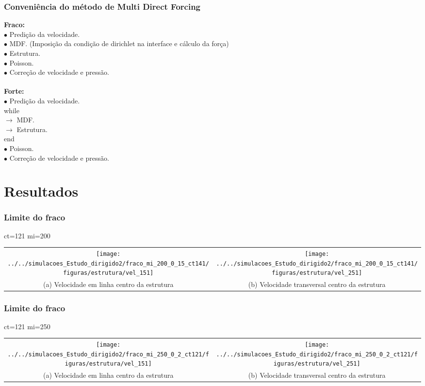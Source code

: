 \documentclass[xcolor=dvipsnames,10pt,aspectratio=169]{beamer}
\begin{document}
		
		\begin{frame}
			\frametitle{Conveniência do método de Multi Direct Forcing}
			
			\flushleft
			\textbf{Fraco:}\\
			$\bullet$ Predição da velocidade.\\
			$\bullet$ MDF. (Imposição da condição de dirichlet na interface e cálculo da força)\\
			$\bullet$ Estrutura.\\
			$\bullet$ Poisson.\\
			$\bullet$ Correção de velocidade e pressão.\\ \\

			\textbf{Forte:}\\
			$\bullet$ Predição da velocidade.\\
			while \\
			\quad	$\longrightarrow$ MDF.\\
			\quad	$\longrightarrow$ Estrutura.\\
			end\\
			$\bullet$ Poisson.\\
			$\bullet$ Correção de velocidade e pressão.\\

		\end{frame}
		
		\section{Resultados}
		\begin{frame}
		\frametitle{Limite do fraco}
			ct=121
			mi=200
			\begin{tabular}{c c}
			{\texttt{[image: ../../simulacoes\_Estudo\_dirigido2/fraco\_mi\_200\_0\_15\_ct141/figuras/estrutura/vel\_151]}}&
		   {\texttt{[image: ../../simulacoes\_Estudo\_dirigido2/fraco\_mi\_200\_0\_15\_ct141/figuras/estrutura/vel\_251]}}\\
		   {(a) Velocidade em linha centro da estrutura} & {(b) Velocidade transversal centro da estrutura}
		\end{tabular}
		\end{frame}
		
		\begin{frame}
		\frametitle{Limite do fraco}
			ct=121
			mi=250
			\begin{tabular}{c c}
				{\texttt{[image: ../../simulacoes\_Estudo\_dirigido2/fraco\_mi\_250\_0\_2\_ct121/figuras/estrutura/vel\_151]}}&				
				{\texttt{[image: ../../simulacoes\_Estudo\_dirigido2/fraco\_mi\_250\_0\_2\_ct121/figuras/estrutura/vel\_251]}}\\
				{(a) Velocidade em linha centro da estrutura} & {(b) Velocidade transversal centro da estrutura}
			\end{tabular}
		\end{frame}
	
\end{document}
